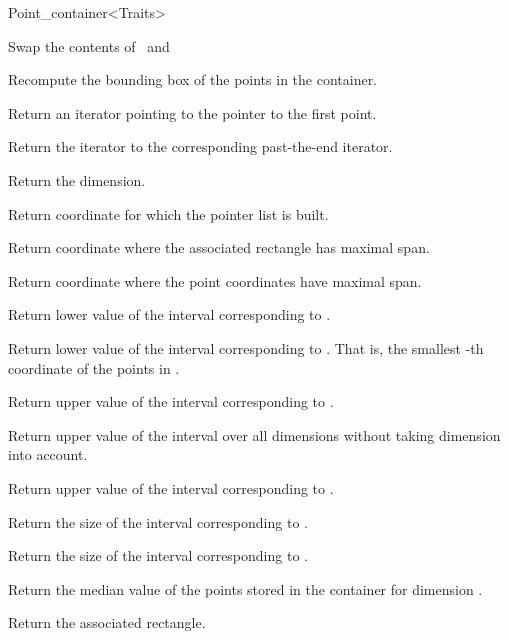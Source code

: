 \begin{ccRefClass}{Point_container<Traits>}
\begin{ccAdvanced}
{Swap the contents of \ccVar\ and }


{Recompute the bounding box of the points in the container.}


{
Return an iterator pointing to the pointer to the first point.
}

{
Return the iterator to the corresponding past-the-end iterator.
}

{
Return the dimension.
}

{
Return coordinate for which the pointer list is built.
}

{
Return coordinate where the associated rectangle has maximal span.
}

{
Return coordinate where the point coordinates have maximal span.
}

{
Return lower value of the interval corresponding to
.
}


{
Return lower value of the interval corresponding to
. That is, the smallest
-th coordinate of the points in
\ccVar.
}


{
Return upper value of the interval corresponding to
.
}

{
Return upper value of the interval over all dimensions
without taking dimension  into account.
}

{
Return upper value of the interval corresponding to
.
}

{
Return the size of the interval corresponding to .
}

{
Return the size of the interval corresponding to .
}

{
Return the median value of the points stored in the container for
dimension .
}

{Return the associated rectangle.}


\end{ccAdvanced}
\end{ccRefClass}
